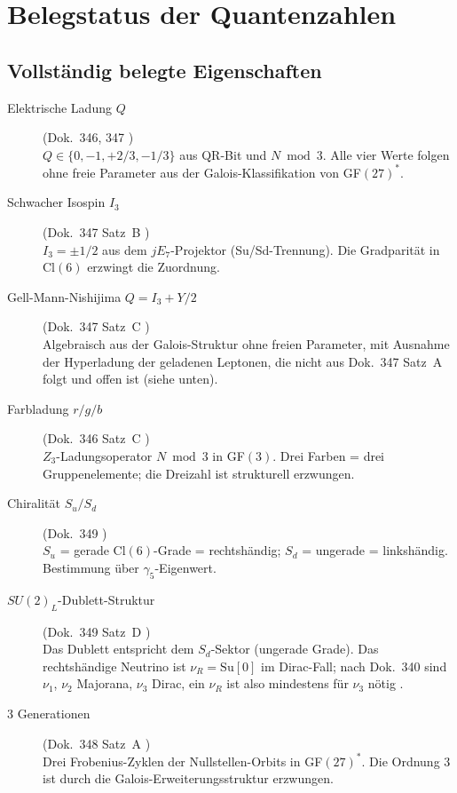 \section{Belegstatus der Quantenzahlen}

\subsection*{Vollständig belegte Eigenschaften \BM}

\begin{description}

\item[Elektrische Ladung $Q$] (Dok.~346, 347 \BM)\\
$Q \in \{0, -1, +2/3, -1/3\}$ aus QR-Bit und $N \bmod 3$.
Alle vier Werte folgen ohne freie Parameter aus der Galois-Klassifikation
von GF$(27)^*$.

\item[Schwacher Isospin $I_3$] (Dok.~347 Satz~B \BM)\\
$I_3 = \pm 1/2$ aus dem $jE_7$-Projektor (Su/Sd-Trennung).
Die Gradparität in Cl$(6)$ erzwingt die Zuordnung.

\item[Gell-Mann-Nishijima $Q = I_3 + Y/2$] (Dok.~347 Satz~C \BM)\\
Algebraisch aus der Galois-Struktur ohne freien Parameter, mit Ausnahme
der Hyperladung der geladenen Leptonen, die nicht aus Dok.~347 Satz~A
folgt und offen ist (siehe unten).

\item[Farbladung $r/g/b$] (Dok.~346 Satz~C \BM)\\
$Z_3$-Ladungsoperator $N \bmod 3$ in GF$(3)$. Drei Farben = drei
Gruppenelemente; die Dreizahl ist strukturell erzwungen.

\item[Chiralität $S_u / S_d$] (Dok.~349 \BM)\\
$S_u$ = gerade Cl$(6)$-Grade = rechtshändig;
$S_d$ = ungerade = linkshändig. Bestimmung über $\gamma_5$-Eigenwert.

\item[$SU(2)_L$-Dublett-Struktur] (Dok.~349 Satz~D \BM)\\
Das Dublett entspricht dem $S_d$-Sektor (ungerade Grade).
Das rechtshändige Neutrino ist $\nu_R = \mathrm{Su}[0]$ im Dirac-Fall;
nach Dok.~340 sind $\nu_1$, $\nu_2$ Majorana, $\nu_3$ Dirac, ein $\nu_R$ ist
also mindestens für $\nu_3$ nötig \SM.

\item[3 Generationen] (Dok.~348 Satz~A \BM)\\
Drei Frobenius-Zyklen der Nullstellen-Orbits in GF$(27)^*$.
Die Ordnung 3 ist durch die Galois-Erweiterungsstruktur erzwungen.


\end{description}
